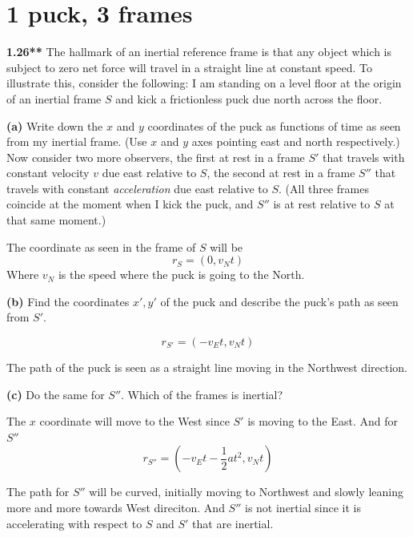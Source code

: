 \documentclass[12pt]{article}
\newcommand{\paren}[1]{\left( #1 \right)}
\begin{document}
\section{1 puck, 3 frames}

\textbf{1.26**} The hallmark of an inertial reference frame is that any object which is subject to zero net force will travel in a straight line at constant speed. To illustrate this, consider the following: I am standing on a level floor at the origin of an inertial frame \(S\) and kick a frictionless puck due north across the floor.

\textbf{(a)} Write down the \(x\) and \(y\) coordinates of the puck as functions of time as seen from my inertial frame. (Use \(x\) and \(y\) axes pointing east and north respectively.) Now consider two more observers, the first at rest in a frame \(S'\) that travels with constant velocity \(v\) due east relative to \(S\), the second at rest in a frame \(S''\) that travels with constant \textit{acceleration} due east relative to \(S\). (All three frames coincide at the moment when I kick the puck, and \(S''\) is at rest relative to \(S\) at that same moment.)

The coordinate as seen in the frame of $S$ will be 
\[
r_S = (0,v_N t)
\]
Where $v_N$ is the speed where the puck is going to the North.




\textbf{(b)} Find the coordinates \(x', y'\) of the puck and describe the puck’s path as seen from \(S'\).

\[
r_{S'} = (-v_E t,v_N t)
\]

The path of the puck is seen as a straight line moving in the Northwest direction. 

\textbf{(c)} Do the same for \(S''\). Which of the frames is inertial?

The $x$ coordinate will move to the West since $S'$ is moving to the East. And for $S''$
\[
r_{S''} = \paren{-v_Et - \frac{1}{2}at^2, v_N t}
\]


The path for $S''$ will be curved, initially moving to Northwest and slowly leaning more and more towards West direciton. And $S''$ is not inertial since it is accelerating with respect to $S$ and $S'$ that are inertial.
\end{document}
